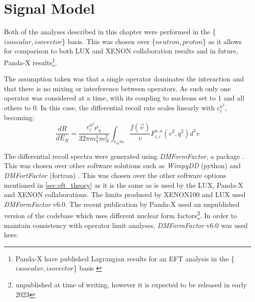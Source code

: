 \section{Signal Model}
\par
Both of the analyses described in this chapter were performed in the \{$isoscalar,isovector$\} basis.
This was chosen over \{$neutron,proton$\} as it allows for comparison to both LUX and XENON collaboration results and in future, Panda-X results\footnote{Panda-X have published Lagrangian results for an EFT analysis in the \{$isoscalar,isovector$\} basis \cite{pandax_2_eft_ref}}.


\par
The assumption taken was that a single operator dominates the interaction and that there is no mixing or interference between operators.
As such only one operator was considered at a time, with its coupling to nucleons set to 1 and all others to 0.
In this case, the differential recoil rate scales linearly with $c^{a^2}_i$, becoming:
\begin{equation}
    \frac{dR}{dE_R} = \frac{c^{a^2}_i \rho_\chi}{32 \pi m^3_\chi m^2_N} \int_{v_min} \frac{f(\vec{v})}{v} F^{a,a}_{i,i} (v^2, q^2) d^3 v
\end{equation}


\par
The differential recoil spectra were generated using \textit{DMFormFactor}, a  package \cite{dmformfactor_ref}.
This was chosen over other software solutions such as \textit{WimpyDD} (python) \cite{wimpydd_ref} and \textit{DMFortFactor} (fortran) \cite{dmfortfactor_ref}.
This was chosen over the other software options mentioned in \autoref{sec:eft_theory} as it is the same as is used by the LUX, Panda-X and XENON collaborations.
The limits produced by XENON100 \cite{xenon100_eft_ref} and LUX \cite{LUX_RUN4_EFT_2021} used \textit{DMFormFactor} v6.0.
The recent publication by Panda-X \cite{pandax_2_eft_ref} used an unpublished version of the codebase which uses different nuclear form factors\footnote{unpublished at time of writing, however it is expected to be released in early 2023}.
In order to maintain consistency with operator limit analyses, \textit{DMFormFactor} v6.0 was used here.



